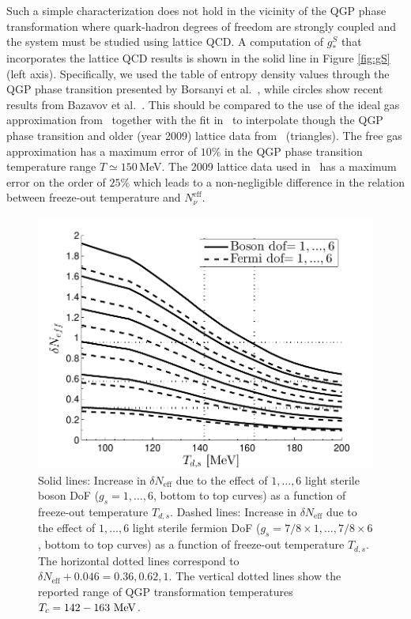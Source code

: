 Such a simple characterization does not hold in the vicinity of the QGP phase transformation where quark-hadron degrees of freedom are strongly coupled and the system must be studied using lattice QCD. A computation of $g_*^S$ that incorporates the lattice QCD results is shown in the solid line in Figure \ref{fig:gS} (left axis). Specifically, we used the table of entropy density values through the QGP phase transition presented by Borsanyi et al.~\cite{Borsanyi:2013bia}, while circles show recent results from Bazavov et al.~\cite{HotQCD:2014kol}. This should be compared to the use of the ideal gas approximation from~\cite{Coleman:2003hs} together with the fit in~\cite{Wantz:2009it} to interpolate though the QGP phase transition and older (year 2009) lattice data from~\cite{Bazavov:2009zn} (triangles). The free gas approximation has a maximum error of $10\%$ in the QGP phase transition temperature range $T\simeq 150$\,MeV. The 2009 lattice data used in~\cite{Anchordoqui:2011nh} has a maximum error on the order of $25\%$ which leads to a non-negligible difference in the relation between freeze-out temperature and $N^{\text{eff}}_{\nu}$.

\begin{figure} 
\centerline{\includegraphics[width=0.9\linewidth]{04-birrell/ModelIndStudy/Figures/Neff_Td_combined.pdf}}
\caption{Solid lines: Increase in $\delta N_{\text{eff}}$ due to the effect of $1,\dots,6$ light sterile boson DoF ($g_s=1,\dots,6$, bottom to top curves) as a function of freeze-out temperature $T_{d,s}$. Dashed lines: Increase in $\delta N_{\text{eff}}$ due to the effect of $1,\dots,6$ light sterile fermion DoF ($g_s=7/8\times 1,\dots,7/8\times 6$, bottom to top curves) as a function of freeze-out temperature $T_{d,s}$. The horizontal dotted lines correspond to $\delta N_{\text{eff}}+0.046=0.36,0.62,1$. The vertical dotted lines show the reported range of QGP transformation temperatures $T_c=142-163\text{ MeV}$. \label{fig:Neff_Td_zoom}}
\end{figure}


